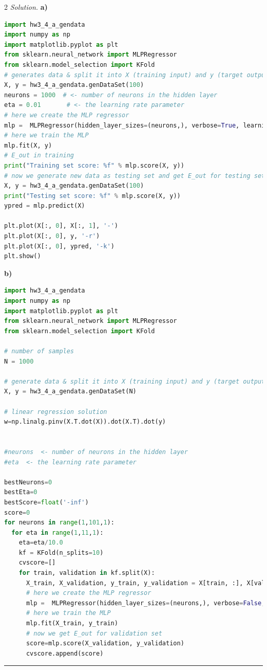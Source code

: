 \documentclass[12pt]{article}
\newcommand{\spacingfactor}{2}
\newcommand\myqed{}                 %
\newcommand{\printmyqed}[1][]       %
  {%
  \ifthenelse{\equal{#1}{Proof}}
  {\renewcommand{\myqed}{\qed}}
  {\renewcommand{\myqed}{}}
  }
\newenvironment{response}[1][\textit{Solution}]{%
  \printmyqed[#1]
  \begin{spacing}{\spacingfactor}
  \medskip                          %
  \noindent \textit{#1.}}{\myqed\end{spacing}\medskip\hrule}
\begin{document}
\begin{response}[Solution] 
  \textbf{a)}
  \lstset{language=Python,frame=single}
  \begin{lstlisting}[language=Python,frame=single]
import hw3_4_a_gendata
import numpy as np
import matplotlib.pyplot as plt
from sklearn.neural_network import MLPRegressor
from sklearn.model_selection import KFold
# generates data & split it into X (training input) and y (target output)
X, y = hw3_4_a_gendata.genDataSet(100)
neurons = 1000  # <- number of neurons in the hidden layer
eta = 0.01       # <- the learning rate parameter
# here we create the MLP regressor
mlp =  MLPRegressor(hidden_layer_sizes=(neurons,), verbose=True, learning_rate_init=eta)
# here we train the MLP
mlp.fit(X, y)
# E_out in training
print("Training set score: %f" % mlp.score(X, y))
# now we generate new data as testing set and get E_out for testing set
X, y = hw3_4_a_gendata.genDataSet(100)
print("Testing set score: %f" % mlp.score(X, y))
ypred = mlp.predict(X)

plt.plot(X[:, 0], X[:, 1], '-')
plt.plot(X[:, 0], y, '-r')
plt.plot(X[:, 0], ypred, '-k')
plt.show() 
  \end{lstlisting}

  \textbf{b)}
  \lstset{language=Python,frame=single}
  \begin{lstlisting}[language=Python,frame=single]
import hw3_4_a_gendata
import numpy as np
import matplotlib.pyplot as plt
from sklearn.neural_network import MLPRegressor
from sklearn.model_selection import KFold

# number of samples
N = 1000

# generate data & split it into X (training input) and y (target output)
X, y = hw3_4_a_gendata.genDataSet(N)

# linear regression solution
w=np.linalg.pinv(X.T.dot(X)).dot(X.T).dot(y)


#neurons  <- number of neurons in the hidden layer
#eta  <- the learning rate parameter

bestNeurons=0
bestEta=0
bestScore=float('-inf')
score=0
for neurons in range(1,101,1):
  for eta in range(1,11,1):
    eta=eta/10.0
    kf = KFold(n_splits=10)
    cvscore=[]
    for train, validation in kf.split(X):
      X_train, X_validation, y_train, y_validation = X[train, :], X[validation, :], y[train], y[validation]
      # here we create the MLP regressor
      mlp =  MLPRegressor(hidden_layer_sizes=(neurons,), verbose=False, learning_rate_init=eta)
      # here we train the MLP
      mlp.fit(X_train, y_train)
      # now we get E_out for validation set
      score=mlp.score(X_validation, y_validation)
      cvscore.append(score)


\end{lstlisting}
\end{response}
\end{document}

